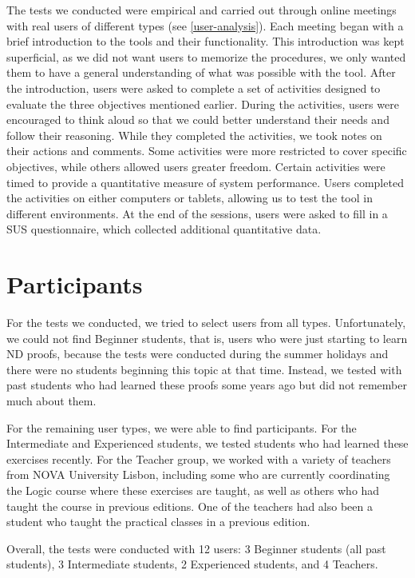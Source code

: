 The tests we conducted were empirical and carried out through online meetings with real users of different types (see \autoref{user-analysis}). Each meeting began with a brief introduction to the tools and their functionality. This introduction was kept superficial, as we did not want users to memorize the procedures, we only wanted them to have a general understanding of what was possible with the tool. After the introduction, users were asked to complete a set of activities designed to evaluate the three objectives mentioned earlier. During the activities, users were encouraged to think aloud so that we could better understand their needs and follow their reasoning. While they completed the activities, we took notes on their actions and comments. Some activities were more restricted to cover specific objectives, while others allowed users greater freedom. Certain activities were timed to provide a quantitative measure of system performance. Users completed the activities on either computers or tablets, allowing us to test the tool in different environments. At the end of the sessions, users were asked to fill in a \gls{SUS} questionnaire, which collected additional quantitative data.

\section{Participants}
For the tests we conducted, we tried to select users from all types. Unfortunately, we could not find Beginner students, that is, users who were just starting to learn \gls{ND} proofs, because the tests were conducted during the summer holidays and there were no students beginning this topic at that time. Instead, we tested with past students who had learned these proofs some years ago but did not remember much about them.

For the remaining user types, we were able to find participants. For the Intermediate and Experienced students, we tested students who had learned these exercises recently. For the Teacher group, we worked with a variety of teachers from NOVA University Lisbon, including some who are currently coordinating the Logic course where these exercises are taught, as well as others who had taught the course in previous editions. One of the teachers had also been a student who taught the practical classes in a previous edition.

Overall, the tests were conducted with 12 users: 3 Beginner students (all past students), 3 Intermediate students, 2 Experienced students, and 4 Teachers.

